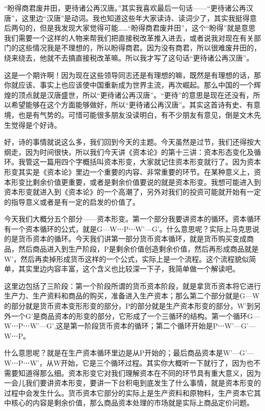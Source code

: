 \documentclass[UTF8, 12pt, a4paper]{ctexrep}
\begin{document}
“盼得商君废井田，更待诸公再汉唐。”其实我喜欢最后一句话——“更待诸公再汉唐”，这里边“汉唐”是动词。我也知道这些年大家读诗、读词少了，其实我挺得意后两句的，但是我发现大家觉得可能……“盼得商君废井田”，这个“盼得”就是意思我们需要一个这样的人物来帮我们把直接税改革推入进去，或者说我对现在有关部门的这些情况我是不理想的，所以盼得商君。因为没有商君，所以很难废井田的，绕来绕去，他就不去搞直接税改革嘛。所以我才写了这句话“更待诸公再汉唐”。

这是一个期许啊！因为现在这些领导同志还是有理想的嘛，既然是有理想的话，那你就应该、事实上也应该使中国重新成为世界主流，再次崛起。那么中国的一个辉煌的顶点就是汉唐盛世，所以“更待诸公再汉唐”。“更待”的意思是现在还没有，所以希望能够在这个方面能够做好，所以“更待诸公再汉唐”。其实这首诗有史、有意境，也是有气势的。可惜可能很多朋友没读明白，有不少朋友有意见，倒是文木先生觉得是个好诗。

好，诗的事情就说这么多，我们回到今天的主题。今天虽然是过节，我们还得按大纲走，因为时间很快，所以我们今天讲《资本论》的第十三讲：资本形态变化及循环。我管这一篇用四个字概括叫资本形变，大家就记住资本形变就行了。因为资本形变其实是《资本论》里边一个重要的内容、非常重要的环节。在某种意义上，资本形变比剩余价值更重要，或者是剩余价值要说的就是资本形变。我想可能进入到资本形变就进入到《资本论》的一个高潮了，另外对我们的投资可能就开始有一定的指导意义或者是有一定的启发的价值了。

今天我们大概分五个部分——资本形变。第一个部分我要讲资本的循环。资本循环有一个资本循环的公式，就是G—W⋅⋅⋅P⋅⋅⋅W’—G’。什么意思呢？实际上马克思说的是货币资本的循环。今天我们讲第一部分货币资本循环，就是货币购买变成商品，然后商品进入到生产阶段，P是剩余价值创造剩余价值，然后再形成商品就是W’，然后再卖掉形成货币这样的一个公式，实际上是一个流程。这个流程貌似简单，其实里边内容丰富，这个含义也比较深一下子，我简单做一个解读吧。

这里边包括了三阶段：第一个阶段所谓的货币资本阶段，就是拿货币资本将它进行生产力、生产资料和商品的购买，准备进入生产资本；那么第二个部分就是G—W的部分就是货币资本变形形变的部分，P的部分就是生产资本形变的部分，W’到另外一个G’是商品资本的形变的部分，它形成了一个三循环的结构。第一个循环G—W⋅⋅⋅P⋅⋅⋅W’—G’,这是第一阶段货币资本的循环；第二个循环开始是P⋅⋅⋅W’—G’—W⋅⋅⋅P。

什么意思呢？就是在生产资本循环里边是从P开始的；最后商品资本是W’—G’—W⋅⋅⋅P⋅⋅⋅W’，从W开始，它是三个循环过程。其实你大概听一下就行了，因为也不需要知道得那么细。资本形变它对我们理解资本在不同的环节具有重大意义，因为一会儿我们要讲资本形变，要讲一下台积电到底发生了什么事情，就是资本形变的过程中会发生什么。货币资本它部分的实际上是生产资料和原物料，生产资本它其中核心的内容是剩余价值，那么商品资本处理的市场就是实际上商品定价问题。
\end{document}
